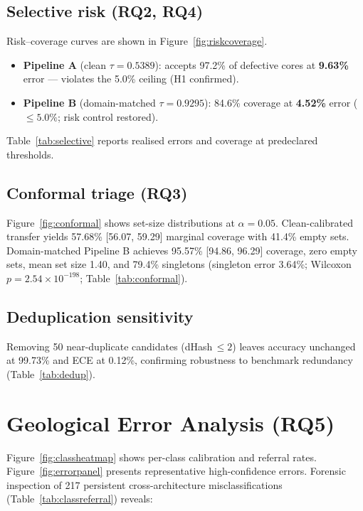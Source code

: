\documentclass[5p,times,twocolumn]{elsarticle}
\begin{document}
\subsection{Selective risk (RQ2, RQ4)}

Risk--coverage curves are shown in Figure~\ref{fig:riskcoverage}.
\begin{itemize}
  \item \textbf{Pipeline A} (clean $\tau{=}0.5389$): accepts 97.2\% of defective cores
        at \textbf{9.63\%} error --- violates the 5.0\% ceiling (H1 confirmed).
  \item \textbf{Pipeline B} (domain-matched $\tau{=}0.9295$): 84.6\% coverage at
        \textbf{4.52\%} error (${\leq}5.0\%$; risk control restored).
\end{itemize}
Table~\ref{tab:selective} reports realised errors and coverage at predeclared thresholds.

\subsection{Conformal triage (RQ3)}

Figure~\ref{fig:conformal} shows set-size distributions at $\alpha{=}0.05$.
Clean-calibrated transfer yields 57.68\% [56.07, 59.29] marginal coverage with 41.4\%
empty sets.
Domain-matched Pipeline B achieves 95.57\% [94.86, 96.29] coverage, zero empty sets,
mean set size 1.40, and 79.4\% singletons (singleton error 3.64\%;
Wilcoxon $p{=}2.54\times10^{-198}$; Table~\ref{tab:conformal}).

\subsection{Deduplication sensitivity}

Removing 50 near-duplicate candidates (dHash\,${\leq}2$) leaves accuracy unchanged at
99.73\% and ECE at 0.12\%, confirming robustness to benchmark redundancy
(Table~\ref{tab:dedup}).

\section{Geological Error Analysis (RQ5)}
\label{sec:errors}

Figure~\ref{fig:classheatmap} shows per-class calibration and referral rates.
Figure~\ref{fig:errorpanel} presents representative high-confidence errors.
Forensic inspection of 217 persistent cross-architecture misclassifications (Table~\ref{tab:classreferral}) reveals:
\end{document}
